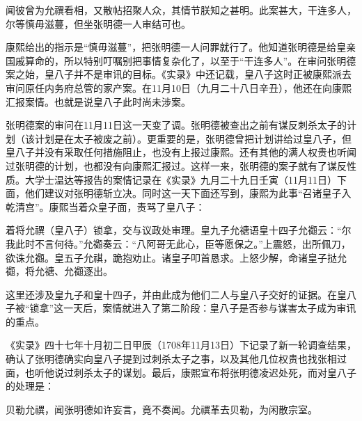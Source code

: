 
\begin{bookquote}闻彼曾为允禩看相，又散帖招聚人众，其情节朕知之甚明。此案甚大，干连多人，尔等慎毋滋蔓，但坐张明德一人审结可也。\end{bookquote}


康熙给出的指示是“慎毋滋蔓”，把张明德一人问罪就行了。他知道张明德是给皇亲国戚算命的，所以特别叮嘱别把事情复杂化了，以至于“干连多人”。在审问张明德案之始，皇八子并不是审讯的目标。《实录》中还记载，皇八子这时正被康熙派去审问原任内务府总管的家产案。在11月10日（九月二十八日辛丑），他还在向康熙汇报案情。也就是说皇八子此时尚未涉案。



张明德案的审问在11月11日这一天变了调。张明德被查出之前有谋反刺杀太子的计划（该计划是在太子被废之前）。更重要的是，张明德曾把计划讲给过皇八子，但皇八子并没有采取任何措施阻止，也没有上报过康熙。还有其他的满人权贵也听闻过张明德的计划，也都没有向康熙汇报过。这样一来，张明德的案子就有了谋反性质。大学士温达等报告的案情记录在《实录》九月二十九日壬寅（11月11日）下面，他们建议对张明德斩立决。同时这一天下面还写到，康熙为此事“召诸皇子入乾清宫”。康熙当着众皇子面，责骂了皇八子：



\begin{bookquote}着将允禩（皇八子）锁拿，交与议政处审理。皇九子允禟语皇十四子允禵云：“尔我此时不言何待。”允禵奏云：“八阿哥无此心，臣等愿保之。”上震怒，出所佩刀，欲诛允禵。皇五子允祺，跪抱劝止。诸皇子叩首恳求。上怒少解，命诸皇子挞允禵，将允禟、允禵逐出。\end{bookquote}


这里还涉及皇九子和皇十四子，并由此成为他们二人与皇八子交好的证据。在皇八子被“锁拿”这一天后，案情就进入了第二阶段：皇八子是否参与谋害太子成为审讯的重点。



《实录》四十七年十月初二日甲辰（1708年11月13日）下记录了新一轮调查结果，确认了张明德确实向皇八子提到过刺杀太子之事，以及其他几位权贵也找张相过面，也听他说过刺杀太子的谋划。最后，康熙宣布将张明德凌迟处死，而对皇八子的处理是：



\begin{bookquote}贝勒允禩，闻张明德如许妄言，竟不奏闻。允禩革去贝勒，为闲散宗室。\end{bookquote}


